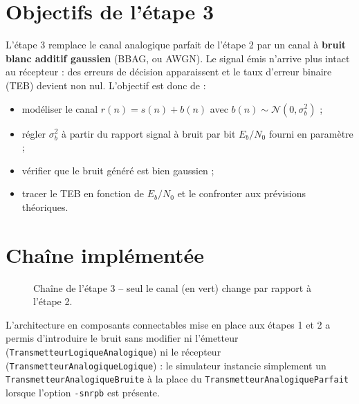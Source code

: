 \documentclass[11pt,a4paper]{article}
\newcommand{\EbNo}{E_b/N_0}
\begin{document}
\section{Objectifs de l'étape 3}
L'étape 3 remplace le canal analogique parfait de l'étape 2 par un canal à \textbf{bruit blanc additif gaussien} (BBAG, ou AWGN). Le signal émis n'arrive plus intact au récepteur : des erreurs de décision apparaissent et le taux d'erreur binaire (TEB) devient non nul. L'objectif est donc de :
\begin{itemize}
  \item modéliser le canal $r(n) = s(n) + b(n)$ avec $b(n)\sim\mathcal N(0,\sigma_b^2)$ ;
  \item régler $\sigma_b^2$ à partir du rapport signal à bruit par bit $\EbNo$ fourni en paramètre ;
  \item vérifier que le bruit généré est bien gaussien ;
  \item tracer le TEB en fonction de $\EbNo$ et le confronter aux prévisions théoriques.
\end{itemize}

\section{Chaîne implémentée}
\begin{figure}[htbp]\centering
{}
\caption{Chaîne de l'étape 3 -- seul le canal (en vert) change par rapport à l'étape 2.}
\end{figure}
L'architecture en composants connectables mise en place aux étapes 1 et 2 a permis d'introduire le bruit sans modifier ni l'émetteur (\texttt{TransmetteurLogiqueAnalogique}) ni le récepteur (\texttt{TransmetteurAnalogiqueLogique}) : le simulateur instancie simplement un \texttt{TransmetteurAnalogiqueBruite} à la place du \texttt{TransmetteurAnalogiqueParfait} lorsque l'option \texttt{-snrpb} est présente.
\end{document}
